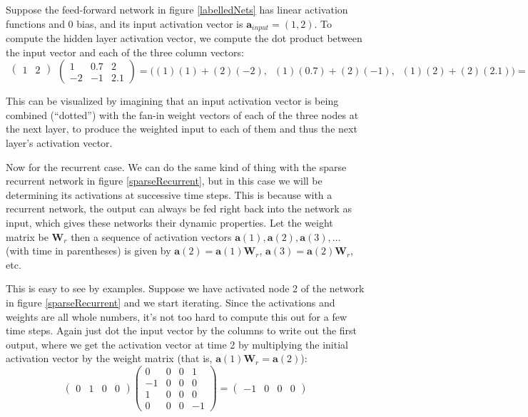Suppose the feed-forward network in figure \ref{labelledNets} has linear activation functions and 0 bias, and its input activation vector is $\textbf{a}_{input} = (1,2)$. To compute the hidden layer activation vector, we compute the dot product between the input vector and each of the three column vectors:
\[
  \begin{matrix}\begin{pmatrix}1 & 2\end{pmatrix}\\\mbox{}\end{matrix}
  \begin{pmatrix} 1 & 0.7 & 2 \\ -2 & -1 & 2.1 \end{pmatrix} 
  =
  \bigg( (1)(1) + (2)(-2) ,\;\; (1)(0.7) + (2)(-1) ,\;\; (1)(2)+ (2)(2.1) \bigg)
  =
  \begin{pmatrix}  -3 \;\; -1.3 \;\;\; 6.2  \end{pmatrix}
\]
\vspace*{.1cm} 

This can be visualized by imagining that an input activation vector is being combined (``dotted'') with the fan-in weight vectors of each of the three nodes at the next layer, to produce the weighted input to each of them and thus the next layer's activation vector. 

Now for the recurrent case. We can do the same kind of thing with the sparse recurrent network in figure \ref{sparseRecurrent}, but in this case we will be determining its activations at successive time steps. This is because with a recurrent network, the output can always be fed right back into the network as input, which gives these networks their dynamic properties. Let the weight matrix be  $\textbf{W}_{r}$ then a sequence of activation vectors $\textbf{a}(1), \textbf{a}(2), \textbf{a}(3), \dots$ (with time in parentheses) is given by $\textbf{a}(2) = \textbf{a}(1) \textbf{W}_{r}$, $\textbf{a}(3) = \textbf{a}(2) \textbf{W}_{r}$, etc. 

This is easy to see by examples. Suppose we have activated node 2 of the network in figure \ref{sparseRecurrent} and we start iterating. Since the activations and weights are all whole numbers, it's not too hard to compute this out for a few time steps. Again just dot the input vector by the columns to write out the first output, where we get the activation vector at time 2 by multiplying the initial activation vector by the weight matrix (that is, $\textbf{a}(1) \textbf{W}_{r} = \textbf{a}(2)$):
\[
\begin{pmatrix}
0 & 1 & 0 & 0  
\end{pmatrix} 
\begin{pmatrix}
0 & 0 & 0 & 1 \\
-1 & 0 & 0 & 0 \\
1 & 0 & 0 & 0 \\
0 & 0 & 0 & -1
\end{pmatrix}
=
\begin{pmatrix}
-1 & 0 & 0 & 0
\end{pmatrix} 
\]
\vspace*{.1cm} 

